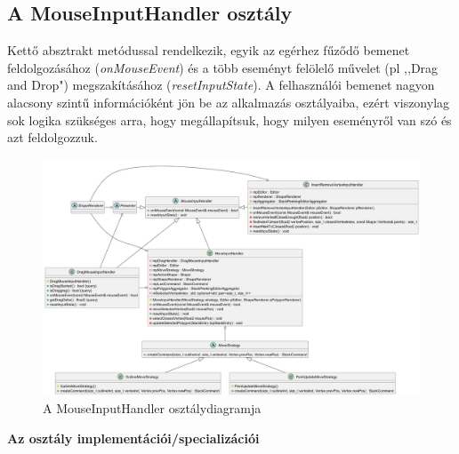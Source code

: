 \subsection{A MouseInputHandler osztály}

Kettő absztrakt metódussal rendelkezik, egyik az egérhez fűződő bemenet feldolgozásához (\textit{onMouseEvent}) és a több eseményt felölelő művelet (pl ,,Drag and Drop") megszakításához (\textit{resetInputState}). A felhasználói bemenet nagyon alacsony szintű információként jön be az alkalmazás osztályaiba, ezért viszonylag sok logika szükséges arra, hogy megállapítsuk, hogy milyen eseményről van szó és azt feldolgozzuk.

\begin{figure}[H]
    \centering
    \includegraphics[width=1\linewidth]{images/class_mouse_input_handler.png}
    \caption{A MouseInputHandler osztálydiagramja}
    \label{fig:class_mouse_input_handler-1}
\end{figure}

\textbf{Az osztály implementációi/specializációi}

